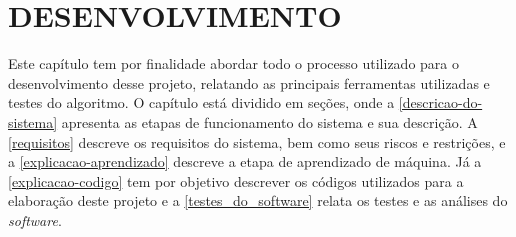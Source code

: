 \chapter{\textbf{DESENVOLVIMENTO}}
\label{desenvolvimento}


Este capítulo tem por finalidade abordar todo o processo utilizado para o desenvolvimento desse projeto, relatando as principais ferramentas utilizadas e testes do algoritmo. O capítulo está dividido em seções, onde a \autoref{descricao-do-sistema} apresenta as etapas de funcionamento do sistema e sua descrição. A \autoref{requisitos} descreve os requisitos do sistema, bem como seus riscos e restrições, e a \autoref{explicacao-aprendizado} descreve a etapa de aprendizado de máquina. Já a \autoref{explicacao-codigo} tem por objetivo descrever os códigos utilizados para a elaboração deste projeto e a \autoref{testes_do_software} relata os testes e as análises do \textit{software}.

%





% 











%